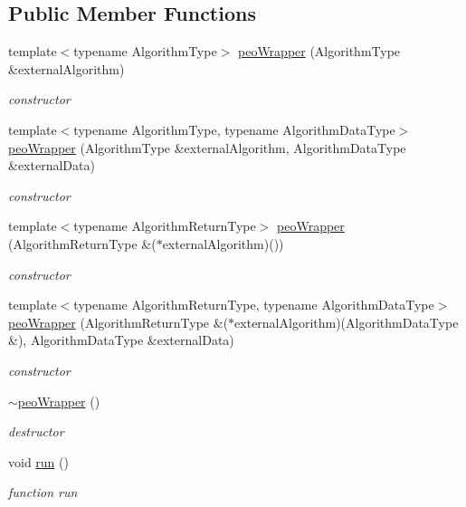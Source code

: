 \subsection*{Public Member Functions}
\begin{CompactItemize}
\item 
template$<$typename Algorithm\-Type$>$ \hyperlink{classpeoWrapper_b0a651003934a41269db4b9f09696b7b}{peo\-Wrapper} (Algorithm\-Type \&external\-Algorithm)
\begin{CompactList}\small\item\em constructor \item\end{CompactList}\item 
template$<$typename Algorithm\-Type, typename Algorithm\-Data\-Type$>$ \hyperlink{classpeoWrapper_f995a4006a82472f3465b079ae303a57}{peo\-Wrapper} (Algorithm\-Type \&external\-Algorithm, Algorithm\-Data\-Type \&external\-Data)
\begin{CompactList}\small\item\em constructor \item\end{CompactList}\item 
template$<$typename Algorithm\-Return\-Type$>$ \hyperlink{classpeoWrapper_593608a5637ba48e0cc3471f093b42bb}{peo\-Wrapper} (Algorithm\-Return\-Type \&($\ast$external\-Algorithm)())
\begin{CompactList}\small\item\em constructor \item\end{CompactList}\item 
template$<$typename Algorithm\-Return\-Type, typename Algorithm\-Data\-Type$>$ \hyperlink{classpeoWrapper_b4a2e26d0806791847db1695ec46cce1}{peo\-Wrapper} (Algorithm\-Return\-Type \&($\ast$external\-Algorithm)(Algorithm\-Data\-Type \&), Algorithm\-Data\-Type \&external\-Data)
\begin{CompactList}\small\item\em constructor \item\end{CompactList}\item 
\hypertarget{classpeoWrapper_756a0ee6b6b3edb98516e8eef707808c}{
\hyperlink{classpeoWrapper_756a0ee6b6b3edb98516e8eef707808c}{$\sim$peo\-Wrapper} ()}
\label{classpeoWrapper_756a0ee6b6b3edb98516e8eef707808c}

\begin{CompactList}\small\item\em destructor \item\end{CompactList}\item 
\hypertarget{classpeoWrapper_ed88d78762dcd6489ff725a4aa2b81a7}{
void \hyperlink{classpeoWrapper_ed88d78762dcd6489ff725a4aa2b81a7}{run} ()}
\label{classpeoWrapper_ed88d78762dcd6489ff725a4aa2b81a7}

\begin{CompactList}\small\item\em function run \item\end{CompactList}\end{CompactItemize}
